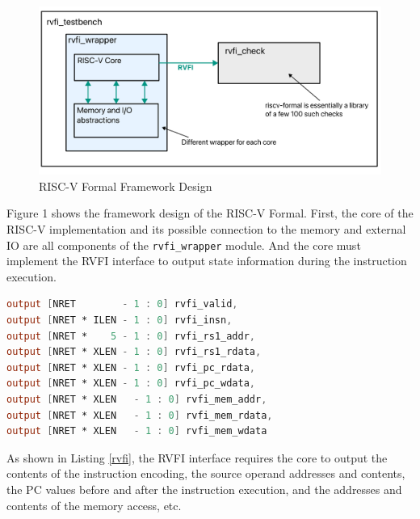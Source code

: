 \documentclass[conference]{IEEEtran}
\theoremstyle{definition}
\begin{document}
\begin{figure}[!htbp]
    \begin{center}
    \includegraphics[width=1\linewidth]{pics/riscvformal.pdf}
    \caption{RISC-V Formal Framework Design}
    \label{fig: riscvformal}
    \end{center}
\end{figure}
Figure 1 shows the framework design of the RISC-V Formal.
First, the core of the RISC-V implementation and its possible connection to the memory and external IO are all components of the \verb|rvfi_wrapper| module.
And the core must implement the RVFI interface to output state information during the instruction execution.

\begin{lstlisting}[language=verilog, caption={RVFI Definition (partial)}, label=rvfi]
output [NRET        - 1 : 0] rvfi_valid,
output [NRET * ILEN - 1 : 0] rvfi_insn,
output [NRET *    5 - 1 : 0] rvfi_rs1_addr,
output [NRET * XLEN - 1 : 0] rvfi_rs1_rdata,
output [NRET * XLEN - 1 : 0] rvfi_pc_rdata,
output [NRET * XLEN - 1 : 0] rvfi_pc_wdata,
output [NRET * XLEN   - 1 : 0] rvfi_mem_addr,
output [NRET * XLEN   - 1 : 0] rvfi_mem_rdata,
output [NRET * XLEN   - 1 : 0] rvfi_mem_wdata
\end{lstlisting}

As shown in Listing \ref{rvfi}, the RVFI interface requires the core to output the contents of the instruction encoding, the source operand addresses and contents, the PC values before and after the instruction execution, and the addresses and contents of the memory access, etc.
\end{document}
